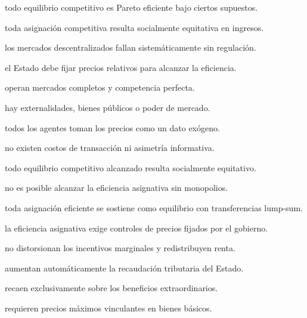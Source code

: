 \begin{opts}
    \item todo equilibrio competitivo es Pareto eficiente bajo ciertos supuestos.
    \item toda asignación competitiva resulta socialmente equitativa en ingresos.
    \item los mercados descentralizados fallan sistemáticamente sin regulación.
    \item el Estado debe fijar precios relativos para alcanzar la eficiencia.
\end{opts}

\begin{opts}
    \item operan mercados completos y competencia perfecta.
    \item hay externalidades, bienes públicos o poder de mercado.
    \item todos los agentes toman los precios como un dato exógeno.
    \item no existen costos de transacción ni asimetría informativa.
\end{opts}

\begin{opts}
    \item todo equilibrio competitivo alcanzado resulta socialmente equitativo.
    \item no es posible alcanzar la eficiencia asignativa sin monopolios.
    \item toda asignación eficiente se sostiene como equilibrio con transferencias lump-sum.
    \item la eficiencia asignativa exige controles de precios fijados por el gobierno.
\end{opts}

\begin{opts}
    \item no distorsionan los incentivos marginales y redistribuyen renta.
    \item aumentan automáticamente la recaudación tributaria del Estado.
    \item recaen exclusivamente sobre los beneficios extraordinarios.
    \item requieren precios máximos vinculantes en bienes básicos.
\end{opts}

